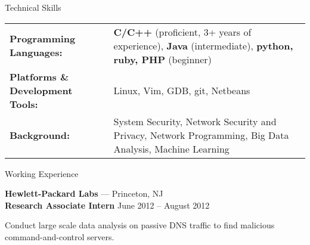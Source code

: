 \documentclass[11pt,oneside]{article}
\newenvironment{ressection_empty}[1]{
	\vspace{-1pt}
	{\fontfamily{phv}\selectfont\Large#1}
	
	\vspace{-8pt} \rule{\textwidth}{.5pt}
}
\newenvironment{ressection}[1]{
	\vspace{-1pt}
	{\fontfamily{phv}\selectfont\Large#1}
	
	\vspace{-8pt} \rule{\textwidth}{.5pt}
	
	\vspace{-8pt}
	\begin{itemize}
	\vspace{.5pt}
}{
	\end{itemize}
}
\newcommand{\resitem}[1]{
	\vspace{1pt}
	\item \begin{flushleft} #1 \end{flushleft}
}
\newcommand{\resbigitem}[3]{
	\vspace{-5pt}
	\item
	\textbf{#1} --- #2 \\
	{#3}
}
\newenvironment{ressubsec}[3]{
	\resbigitem{#1}{#2}{#3}
	\vspace{-4pt}
	\begin{itemize}
}{
	\end{itemize}
}
\begin{document}
\begin{ressection_empty}{Technical Skills}
\vspace{-20pt}
\begin{table}[h]
\begin{tabular}[h]{p{}p{}}

\textbf{Programming Languages:} & \textbf{C/C++} (proficient, 3+ years of experience), \textbf{Java} (intermediate), \textbf{python, ruby, PHP} (beginner)	\\[1.5pt]
\textbf{Platforms \& Development Tools:} & Linux, Vim, GDB, git, Netbeans	\\[1.5pt]
\textbf{Background:} & System Security, Network Security and Privacy, Network Programming, Big Data Analysis, Machine Learning \\
\end{tabular}
\end{table}
\vspace{-8pt}

\begin{comment}
	\resitem{
		\textbf{Programming Languages:} \textbf{C/C++} (proficient, 3+ years of experience), \textbf{Java} (intermediate), \textbf{python, ruby, PHP} (beginner)
	}
	\vspace{-4pt}
	\resitem{
		\textbf{Platforms \& Development Tools:} Linux, Vim, GDB, git, Netbeans
	}
	\vspace{-4pt}
	\resitem{
		\textbf{Background:} System Security, Network Security and Privacy, Network Programming, Big Data Analysis, Machine Learning
	}
\end{comment}


\end{ressection_empty}


\begin{ressection}{Working Experience}
	\begin{ressubsec}{Hewlett-Packard Labs}{Princeton, NJ}{\textbf{Research Associate Intern} \hfill June 2012 -- August 2012}
		\vspace{-2pt}
	\end{ressubsec}
\end{ressection}
\end{document}
